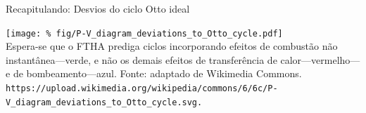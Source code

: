     \begin{frame}{Recapitulando: Desvios do ciclo Otto ideal}\vspace*{-2em}
        \begin{center}
            \texttt{[image: \%
                fig/P-V\_diagram\_deviations\_to\_Otto\_cycle.pdf]}\\
            \footnotesize \alert{Espera-se} que o FTHA prediga ciclos  incorporando  efeitos  de
                combustão não instantânea---verde, e não os demais efeitos de  transferência  de
                calor---vermelho---e  de  bombeamento---azul.  Fonte:  adaptado   de   Wikimedia
                Commons.
            {\tiny\tt https://upload.wikimedia.org/wikipedia/commons/6/6c/P-V\_diagram\_deviations\_to\_Otto\_cycle.svg.}
        \end{center}
    \end{frame}

